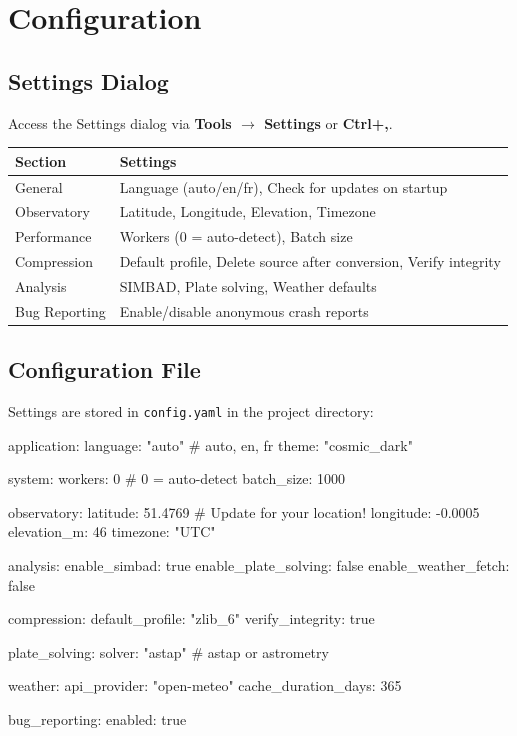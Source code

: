 \documentclass[11pt,a4paper]{article}
\begin{document}
\section{Configuration}
\label{sec:config}

\subsection{Settings Dialog}

Access the Settings dialog via \textbf{Tools $\rightarrow$ Settings} or \textbf{Ctrl+,}.

\begin{center}
\begin{tabular}{lp{9cm}}
\toprule
\textbf{Section} & \textbf{Settings} \\
\midrule
General & Language (auto/en/fr), Check for updates on startup \\
Observatory & Latitude, Longitude, Elevation, Timezone \\
Performance & Workers (0 = auto-detect), Batch size \\
Compression & Default profile, Delete source after conversion, Verify integrity \\
Analysis & SIMBAD, Plate solving, Weather defaults \\
Bug Reporting & Enable/disable anonymous crash reports \\
\bottomrule
\end{tabular}
\end{center}

\subsection{Configuration File}

Settings are stored in \texttt{config.yaml} in the project directory:

\begin{codeblock}
application:
  language: "auto"    # auto, en, fr
  theme: "cosmic_dark"

system:
  workers: 0          # 0 = auto-detect
  batch_size: 1000

observatory:
  latitude: 51.4769   # Update for your location!
  longitude: -0.0005
  elevation_m: 46
  timezone: "UTC"

analysis:
  enable_simbad: true
  enable_plate_solving: false
  enable_weather_fetch: false

compression:
  default_profile: "zlib_6"
  verify_integrity: true

plate_solving:
  solver: "astap"     # astap or astrometry

weather:
  api_provider: "open-meteo"
  cache_duration_days: 365

bug_reporting:
  enabled: true
\end{codeblock}
\end{document}
